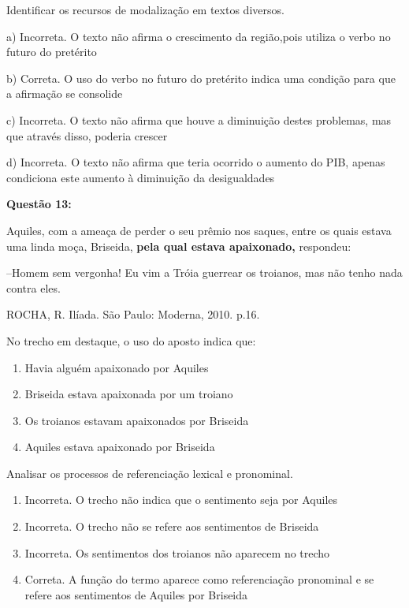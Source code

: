 Identificar os recursos de modalização em textos diversos.

a) Incorreta. O texto não afirma o crescimento da região,pois utiliza o
verbo no futuro do pretérito

b) Correta. O uso do verbo no futuro do pretérito indica uma condição
para que a afirmação se consolide

c) Incorreta. O texto não afirma que houve a diminuição destes
problemas, mas que através disso, poderia crescer

d) Incorreta. O texto não afirma que teria ocorrido o aumento do PIB,
apenas condiciona este aumento à diminuição da desigualdades

\textbf{Questão 13:}

Aquiles, com a ameaça de perder o seu prêmio nos saques, entre os quais
estava uma linda moça, Briseida, \textbf{pela qual estava apaixonado,}
respondeu:

--Homem sem vergonha! Eu vim a Tróia guerrear os troianos, mas não tenho
nada contra eles.

ROCHA, R. Ilíada. São Paulo: Moderna, 2010. p.16.

No trecho em destaque, o uso do aposto indica que:

\begin{enumerate}
\def\labelenumi{\alph{enumi})}
\item
  Havia alguém apaixonado por Aquiles
\item
  Briseida estava apaixonada por um troiano
\item
  Os troianos estavam apaixonados por Briseida
\item
  Aquiles estava apaixonado por Briseida
\end{enumerate}

Analisar os processos de referenciação lexical e pronominal.

\begin{enumerate}
\def\labelenumi{\alph{enumi})}
\item
  Incorreta. O trecho não indica que o sentimento seja por Aquiles
\item
  Incorreta. O trecho não se refere aos sentimentos de Briseida
\item
  Incorreta. Os sentimentos dos troianos não aparecem no trecho
\item
  Correta. A função do termo aparece como referenciação pronominal e se
  refere aos sentimentos de Aquiles por Briseida
\end{enumerate}

